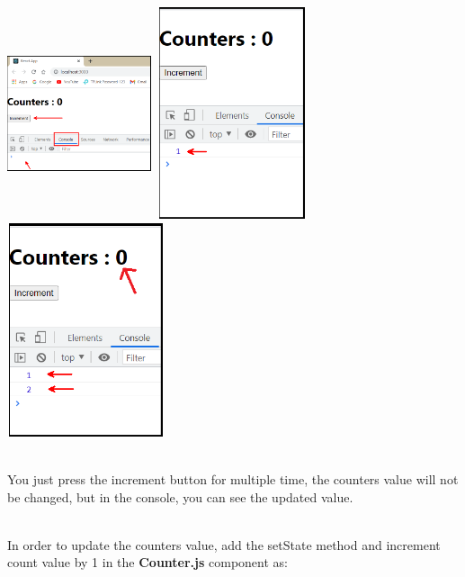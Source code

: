 \documentclass{article}
\begin{document}
\begin{center}
	\noindent \includegraphics*[width=1.67in, height=2.44in]{IMG-09-36}    \includegraphics*[width=1.77in, height=2.45in]{IMG-09-37}    \includegraphics*[width=1.82in, height=2.47in]{IMG-09-38}
\end{center}

\noindent 

\noindent \\
You just press the increment button for multiple time, the counters value will not be changed, but in the console, you can see the updated value.

\noindent \\
In order to update the counters value, add the setState method and increment count value by 1 in the \textbf{Counter.js} component as:
\end{document}
